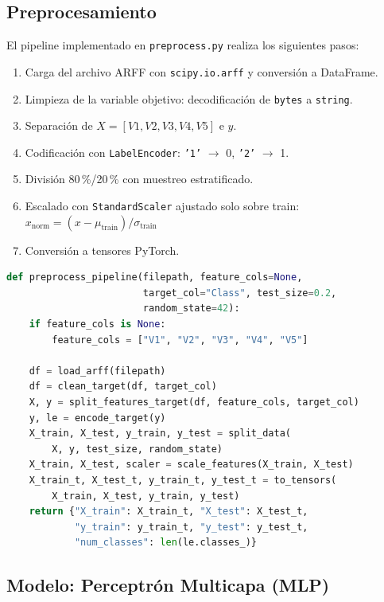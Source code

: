 \documentclass[12pt,a4paper]{article}
\begin{document}
\subsection{Preprocesamiento}

El pipeline implementado en \texttt{preprocess.py} realiza los siguientes pasos:

\begin{enumerate}
  \item Carga del archivo ARFF con \texttt{scipy.io.arff} y conversión a DataFrame.
  \item Limpieza de la variable objetivo: decodificación de \texttt{bytes} a \texttt{string}.
  \item Separación de $X = [V1, V2, V3, V4, V5]$ e $y$.
  \item Codificación con \texttt{LabelEncoder}: \texttt{'1'} $\to$ 0, \texttt{'2'} $\to$ 1.
  \item División 80\,\%/20\,\% con muestreo estratificado.
  \item Escalado con \texttt{StandardScaler} ajustado solo sobre train:
        $x_{\text{norm}} = (x - \mu_{\text{train}}) / \sigma_{\text{train}}$
  \item Conversión a tensores PyTorch.
\end{enumerate}

\begin{lstlisting}[language=Python, caption={Pipeline de preprocesamiento (\texttt{preprocess.py})}]
def preprocess_pipeline(filepath, feature_cols=None,
                        target_col="Class", test_size=0.2,
                        random_state=42):
    if feature_cols is None:
        feature_cols = ["V1", "V2", "V3", "V4", "V5"]

    df = load_arff(filepath)
    df = clean_target(df, target_col)
    X, y = split_features_target(df, feature_cols, target_col)
    y, le = encode_target(y)
    X_train, X_test, y_train, y_test = split_data(
        X, y, test_size, random_state)
    X_train, X_test, scaler = scale_features(X_train, X_test)
    X_train_t, X_test_t, y_train_t, y_test_t = to_tensors(
        X_train, X_test, y_train, y_test)
    return {"X_train": X_train_t, "X_test": X_test_t,
            "y_train": y_train_t, "y_test": y_test_t,
            "num_classes": len(le.classes_)}
\end{lstlisting}

\subsection{Modelo: Perceptrón Multicapa (MLP)}
\end{document}
